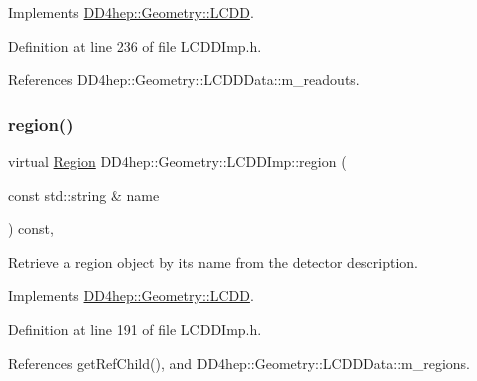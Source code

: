 Implements \hyperlink{class_d_d4hep_1_1_geometry_1_1_l_c_d_d_a5c815f21643ebb5cce9d1d1e71772431}{D\+D4hep\+::\+Geometry\+::\+L\+C\+DD}.



Definition at line 236 of file L\+C\+D\+D\+Imp.\+h.



References D\+D4hep\+::\+Geometry\+::\+L\+C\+D\+D\+Data\+::m\+\_\+readouts.

\hypertarget{class_d_d4hep_1_1_geometry_1_1_l_c_d_d_imp_a5c4444654f7c48fde9b12bb9ea06c663}{}\label{class_d_d4hep_1_1_geometry_1_1_l_c_d_d_imp_a5c4444654f7c48fde9b12bb9ea06c663} 
\subsubsection{\texorpdfstring{region()}{region()}}
{\footnotesize\ttfamily virtual \hyperlink{class_d_d4hep_1_1_geometry_1_1_region}{Region} D\+D4hep\+::\+Geometry\+::\+L\+C\+D\+D\+Imp\+::region (\begin{DoxyParamCaption}\item[{const std\+::string \&}]{name }\end{DoxyParamCaption}) const\hspace{0.3cm}{\ttfamily [inline]}, {\ttfamily [virtual]}}



Retrieve a region object by it\textquotesingle{}s name from the detector description. 



Implements \hyperlink{class_d_d4hep_1_1_geometry_1_1_l_c_d_d_adbe06759881707fe995472c03810c0ff}{D\+D4hep\+::\+Geometry\+::\+L\+C\+DD}.



Definition at line 191 of file L\+C\+D\+D\+Imp.\+h.



References get\+Ref\+Child(), and D\+D4hep\+::\+Geometry\+::\+L\+C\+D\+D\+Data\+::m\+\_\+regions.

\hypertarget{class_d_d4hep_1_1_geometry_1_1_l_c_d_d_imp_aca412d8a3df0c6c06f32f4013a92e01d}{}\label{class_d_d4hep_1_1_geometry_1_1_l_c_d_d_imp_aca412d8a3df0c6c06f32f4013a92e01d} 
